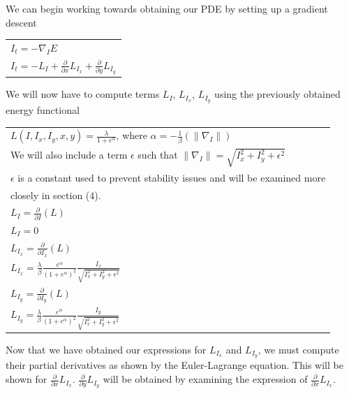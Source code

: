 \documentclass{article}
\begin{document}
    \noindent
    We can begin working towards obtaining our PDE by setting up a gradient descent
      \begin{center}
        \begin{tabular}{l}
          $I_{t} = -\nabla_{I}E$\\
          $I_{t} = -L_{I} + \frac{\partial}{\partial x}L_{I_{x}} + \frac{\partial}{\partial y}L_{I_{y}}$
        \end{tabular}
      \end{center}
    \vspace{12pt}

    \noindent
    We will now have to compute terms $L_{I}$, $L_{I_{x}}$, $L_{I_{y}}$ using the previously obtained energy functional
      \begin{center}
        \begin{tabular}{l}
          $L(I,I_{x},I_{y},x,y) = \frac{\lambda}{1+e^{\alpha}}$, where $\alpha = -\frac{1}{\beta}(\| \nabla_{I} \|)$\\
          We will also include a term $\epsilon$ such that $\| \nabla_{I} \| = \sqrt{I_{x}^2 + I_{y}^2 + \epsilon^2}$\\
          $\epsilon$ is a constant used to prevent stability issues and will be examined more\\
          \vspace{12pt}
          closely in section (4).\\
          $L_{I} = \frac{\partial}{\partial I}(L)$\\
          $L_{I} = 0$\\
          $L_{I_{x}} = \frac{\partial}{\partial I_{x}}(L)$\\
          $L_{I_{x}} = \frac{\lambda}{\beta} \frac{e^\alpha}{(1+e^{\alpha})^2} \frac{I_{x}}{\sqrt{I_{x}^2 + I_{y}^2 + \epsilon^2}}$\\
          $L_{I_{y}} = \frac{\partial}{\partial I_{y}}(L)$\\
          $L_{I_{y}} = \frac{\lambda}{\beta} \frac{e^\alpha}{(1+e^{\alpha})^2} \frac{I_{y}}{\sqrt{I_{x}^2 + I_{y}^2 + \epsilon^2}}$\\
        \end{tabular}
      \end{center}
      \vspace{12pt}

    \noindent
    Now that we have obtained our expressions for $L_{I_{x}}$ and $L_{I_{y}}$, we must compute their partial derivatives
    as shown by the Euler-Lagrange equation. This will be shown for $\frac{\partial}{\partial x}L_{I_{x}}$. $\frac{\partial}{\partial y}L_{I_{y}}$ will be obtained by examining
    the expression of $\frac{\partial}{\partial x}L_{I_{x}}$.\\
\end{document}
